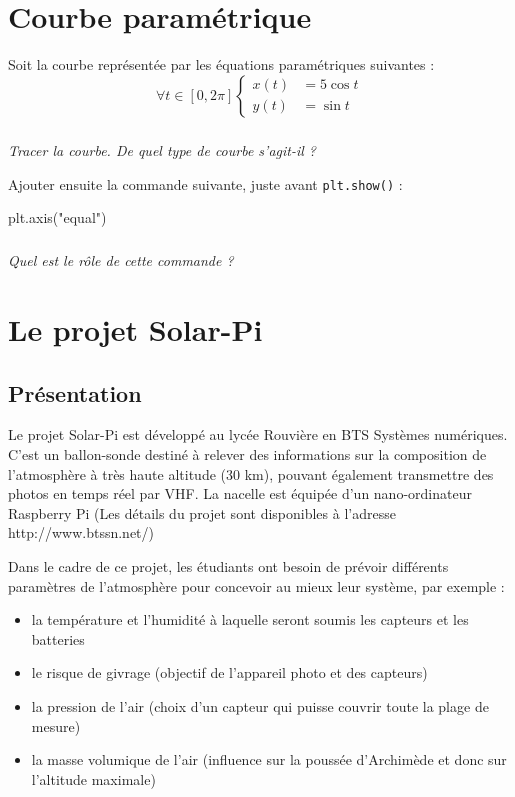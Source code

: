 \documentclass[10pt]{article}
\begin{document}


\section{Courbe paramétrique}
\setcounter{subparagraph}{0}
Soit la courbe représentée par les équations paramétriques suivantes :
\[
\forall t \in [0,2\pi]
\left\lbrace
\begin{aligned}
x(t)&=5 \cos t \\
y(t)&=\sin t
\end{aligned}
\right.
\]

\subparagraph{}
\textit{Tracer la courbe. De quel type de courbe s'agit-il ?}


\begin{py}
Ajouter ensuite la commande suivante, juste avant \texttt{plt.show()} :
\begin{python}
plt.axis("equal")
\end{python}
\end{py}

\subparagraph{}
\textit{Quel est le rôle de cette commande ?}



\section{Le projet Solar-Pi}
\setcounter{subparagraph}{0}
\subsection{Présentation}

Le projet Solar-Pi est développé au lycée Rouvière en BTS Systèmes numériques. C'est un ballon-sonde destiné à relever des informations sur la composition de l'atmosphère à très haute altitude (30 km), pouvant également transmettre des photos en temps réel par VHF. La nacelle est équipée d'un nano-ordinateur Raspberry Pi (Les détails du projet sont disponibles à l'adresse http://www.btssn.net/)

\begin{center}
\end{center}


Dans le cadre de ce projet, les étudiants ont besoin de prévoir différents paramètres de l'atmosphère pour concevoir au mieux leur système, par exemple :
\begin{itemize}
\item la température et l'humidité à laquelle seront soumis les capteurs et les batteries
\item le risque de givrage (objectif de l'appareil photo et des capteurs)
\item la pression de l'air (choix d'un capteur qui puisse couvrir toute la plage de mesure)
\item la masse volumique de l'air (influence sur la poussée d'Archimède et donc sur l'altitude maximale)
\end{itemize}
\end{document}
